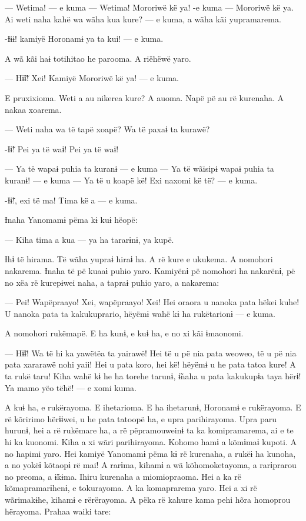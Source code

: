 — Wetima! --- e kuma --- Wetima! Mororiwë kë ya! -e kuma --- Mororiwë kë
ya. Ai weti naha kahë wa wãha kua kure? --- e kuma, a wãha kãi
yupramarema. 

-Ɨɨɨ! kamiyë Horonamɨ ya ta kui! --- e kuma. 

A wã kãi haɨ totihitao he parooma. A riëhëwë yaro. 

— Hɨ̃ɨ̃! Xei! Kamiyë Mororiwë kë ya! --- e kuma. 

E pruxixioma. Weti a au nikerea kure? A auoma. Napë pë au rë kurenaha. A nakaa xoarema. 

— Weti naha wa të tapë xoapë? Wa të paxaɨ ta kurawë? 

-Ɨɨ̃! Pei ya të waɨ! Pei ya të waɨ! 

— Ya të wapaɨ puhia ta kuranɨ --- e kuma --- Ya të wãisipɨ wapaɨ puhia ta
kuranɨ! --- e kuma --- Ya të u koapë kë! Exi naxomi kë të? --- e kuma. 

-Ɨɨ̃!, exi të ma! Tima kë a --- e kuma. 

Ɨnaha Yanomamɨ pëma kɨ kuɨ hëopë: 

— Kiha tima a kua --- ya ha tararɨnɨ, ya kupë. 

Ɨhɨ të hirama. Të wãha yupraɨ hiraɨ ha. A rë kure e ukukema. A nomohori
nakarema. Ɨnaha të pë kuaaɨ puhio yaro. Kamiyënɨ pë nomohori ha
nakarënɨ, pë no xëa rë kurepɨwei naha, a tapraɨ puhio yaro, a nakarema: 

— Pei! Wapëpraayo! Xei, wapëpraayo! Xei! Hei oraora u nanoka pata hëkei
kuhe! U nanoka pata ta kakukuprario, hëyëmɨ wahë kɨ ha rukëtarionɨ --- e
kuma. 

A nomohori rukëmapë. E ha kunɨ, e kuɨ ha, e no xi kãi ɨmaonomi. 

— Hɨ̃ɨ! Wa të hi ka yawëtëa ta yairawë! Hei të u pë nia pata weoweo, të u
pë nia pata xararawë nohi yaii! Hei u pata koro, hei kë! hëyëmɨ u he
pata tatoa kure! A ta rukë taru! Kiha wahë kɨ he ha torehe tarunɨ, ɨ̃naha
u pata kakukupɨa taya hërɨ! Ya mamo yëo tëhë! --- e xomi kuma. 

A kuɨ ha, e rukërayoma. E ihetarioma. E ha ihetarunɨ, Horonamɨ e
rukërayoma. E rë kõririmo hërɨɨwei, u he pata tatoopë ha, e upra
parihirayoma. Upra paru hurunɨ, hei a rë rukëmare ha, a rë pëpramouweinɨ
ta ka komipramarema, ai e te hi ka kuonomi. Kiha a xi wãri parihirayoma.
Kohomo hamɨ a kõmɨmaɨ kupoti. A no hapimi yaro. Hei kamiyë Yanomamɨ pëma
kɨ rë kurenaha, a rukëɨ ha kunoha, a no yokëɨ kõtaopɨ rë mai! A rarɨma,
kihamɨ a wã kõhomoketayoma, a rarɨprarou no preoma, a ɨ̃kɨma. Ihiru
kurenaha a miomiopraoma. Hei a ka rë kõmapramarɨhenɨ, e tokurayoma. A ka
komaprarema yaro. Hei a xi rë wãrimakɨhe, kihamɨ e rërërayoma. A pëka rë
kahure kama pehi hõra homoprou hërayoma. Prahaa waiki tare: 

